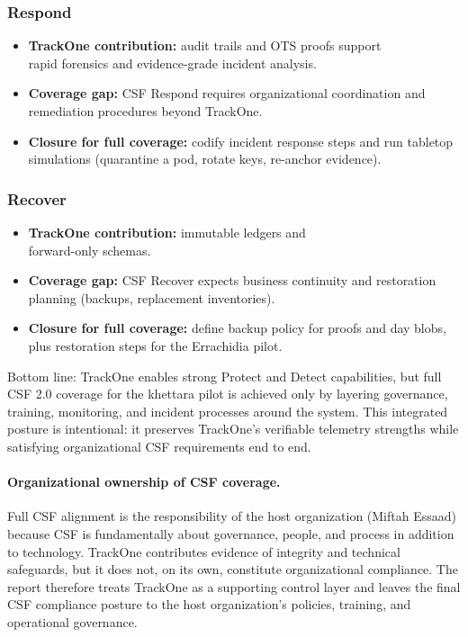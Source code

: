 \subsubsection{Respond}
\begin{itemize}[nosep]
  \item \textbf{TrackOne contribution:} audit trails and \ac{OTS} proofs support\\ rapid forensics and evidence-grade incident analysis.
  \item \textbf{Coverage gap:} C\ac{SF} Respond requires organizational coordination and remediation procedures beyond TrackOne.
  \item \textbf{Closure for full coverage:} codify incident response steps and run tabletop simulations (quarantine a pod, rotate keys, re-anchor evidence).
\end{itemize}

\subsubsection{Recover}
\begin{itemize}[nosep]
  \item \textbf{TrackOne contribution:} immutable ledgers and\\ forward-only schemas.
  \item \textbf{Coverage gap:} C\ac{SF} Recover expects business continuity and restoration planning (backups, replacement inventories).
  \item \textbf{Closure for full coverage:} define backup policy for proofs and day blobs, plus restoration steps for the Errachidia pilot.
\end{itemize}

Bottom line: TrackOne enables strong Protect and Detect capabilities, but full C\ac{SF} 2.0 coverage for the khettara pilot is achieved only by layering governance, training, monitoring, and incident processes around the system.
This integrated posture is intentional: it preserves TrackOne's verifiable telemetry strengths while satisfying organizational C\ac{SF} requirements end to end.

\paragraph{Organizational ownership of CSF coverage.}
Full C\ac{SF} alignment is the responsibility of the host organization (Miftah Essaad) because C\ac{SF} is fundamentally about governance, people, and process in addition to technology.
TrackOne contributes evidence of integrity and technical safeguards, but it does not, on its own, constitute organizational compliance.
The report therefore treats TrackOne as a supporting control layer and leaves the final C\ac{SF} compliance posture to the host organization's policies, training, and operational governance.

